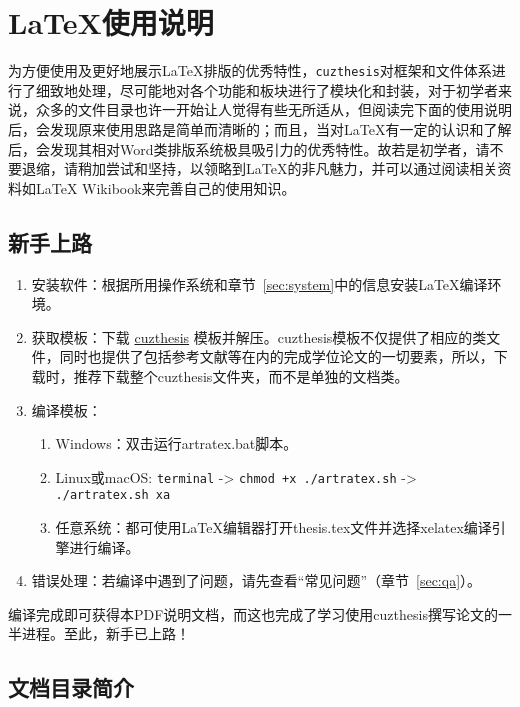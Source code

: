 \chapter{\LaTeX{}使用说明}\label{chap:guide}

为方便使用及更好地展示\LaTeX{}排版的优秀特性，\texttt{cuzthesis}对框架和文件体系进行了细致地处理，尽可能地对各个功能和板块进行了模块化和封装，对于初学者来说，众多的文件目录也许一开始让人觉得有些无所适从，但阅读完下面的使用说明后，会发现原来使用思路是简单而清晰的；而且，当对\LaTeX{}有一定的认识和了解后，会发现其相对Word类排版系统极具吸引力的优秀特性。故若是初学者，请不要退缩，请稍加尝试和坚持，以领略到\LaTeX{}的非凡魅力，并可以通过阅读相关资料如\LaTeX{} Wikibook\citep{wikibook2014latex}来完善自己的使用知识。

\section{新手上路}

\begin{enumerate}
    \item 安装软件：根据所用操作系统和章节~\ref{sec:system}中的信息安装\LaTeX{}编译环境。
    \item 获取模板：下载 \href{https://github.com/xiehao/CUZThesis}{cuzthesis} 模板并解压。cuzthesis模板不仅提供了相应的类文件，同时也提供了包括参考文献等在内的完成学位论文的一切要素，所以，下载时，推荐下载整个cuzthesis文件夹，而不是单独的文档类。
    \item 编译模板：
        \begin{enumerate}
            \item Windows：双击运行artratex.bat脚本。
            \item Linux或macOS: {\scriptsize \verb|terminal| -> \verb|chmod +x ./artratex.sh| -> \verb|./artratex.sh xa|}
            \item 任意系统：都可使用\LaTeX{}编辑器打开thesis.tex文件并选择xelatex编译引擎进行编译。
        \end{enumerate}
    \item 错误处理：若编译中遇到了问题，请先查看“常见问题”（章节~\ref{sec:qa}）。
\end{enumerate}

编译完成即可获得本PDF说明文档，而这也完成了学习使用cuzthesis撰写论文的一半进程。至此，新手已上路！

\section{文档目录简介}

